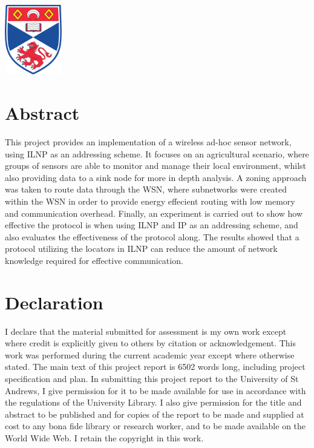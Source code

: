 \documentclass[12pt]{article}
\begin{document}
\begin{titlepage}
\includegraphics[width = 2.5cm]{images/standrewslogo.png}
 

\vfill %

\end{titlepage}


\part*{Abstract}

This project provides an implementation of a wireless ad-hoc sensor network, using ILNP as an addressing scheme. It focuses on an agricultural scenario, where groups of sensors are able to monitor and manage their local environment, whilst also providing data to a sink node for more in depth analysis. A zoning approach was taken to route data through the WSN, where subnetworks were created within the WSN in order to provide energy effecient routing with low memory and communication overhead. Finally, an experiment is carried out to show how effective the protocol is when using ILNP and IP as an addressing scheme, and also evaluates the effectiveness of the protocol along. The results showed that a protocol utilizing the locators in ILNP can reduce the amount of network knowledge required for effective communication.

\part*{Declaration}
I declare that the material submitted for
assessment is my own work except where credit is
explicitly given to others by citation or
acknowledgement. This work was performed during
the current academic year except where otherwise
stated.
The main text of this project report is 6502 words long, including project specification and plan.
In submitting this project report to the University of
St Andrews, I give permission for it to be made
available for use in accordance with the regulations of
the University Library. I also give permission for
the title and abstract to be published and for copies of
the report to be made and supplied at cost to any bona
fide library or research worker, and to be made
available on the World Wide Web. I retain the
copyright in this work.
\end{document}
